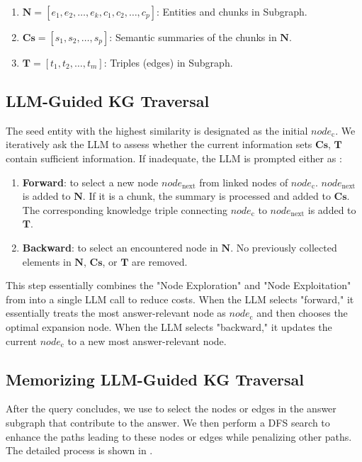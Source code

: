 \begin{enumerate}[label={},leftmargin=*,nosep]
    \item $\boldsymbol{N}=[e_1,e_2,\dots,e_k,c_1,c_2,\dots,c_p]$: Entities and chunks in Subgraph.
    \item $\boldsymbol{Cs}=[s_1,s_2,\dots,s_p]$: Semantic summaries of the chunks in $\boldsymbol{N}$.
    \item $\boldsymbol{T}=[t_1,t_2,\dots,t_m]$: Triples (edges) in Subgraph.
\end{enumerate}

\subsection{LLM-Guided KG Traversal}

The seed entity with the highest similarity is designated as the initial $node_{\text{c}}$. We iteratively ask the LLM to assess whether the current information sets $\boldsymbol{Cs}$, $\boldsymbol{T}$ contain sufficient information. If inadequate, the LLM is prompted either as :

\begin{enumerate}[label={},leftmargin=*,nosep]
    \item \textbf{Forward}: to select a new node $node_{\text{next}}$ from linked nodes of $node_{\text{c}}$. $node_{\text{next}}$ is added to $\boldsymbol{N}$. If it is a chunk, the summary is processed and added to $\boldsymbol{Cs}$. The corresponding knowledge triple connecting $node_{\text{c}}$ to $node_{\text{next}}$ is added to $\boldsymbol{T}$. 
    \item \textbf{Backward}: to select an encountered node in $\boldsymbol{N}$. No previously collected elements in $\boldsymbol{N}$, $\boldsymbol{Cs}$, or $\boldsymbol{T}$ are removed.
\end{enumerate}

This step essentially combines the "Node Exploration" and "Node Exploitation" from  into a single LLM call to reduce costs. When the LLM selects "forward," it essentially treats the most answer-relevant node as $ node_{\text{c}} $ and then chooses the optimal expansion node. When the LLM selects "backward," it updates the current $ node_{\text{c}} $ to a new most answer-relevant node.

\subsection{Memorizing LLM-Guided KG Traversal}
After the query concludes, we use  to select the nodes or edges in the answer subgraph that contribute to the answer. We then perform a DFS search to enhance the paths leading to these nodes or edges while penalizing other paths. The detailed process is shown in .

